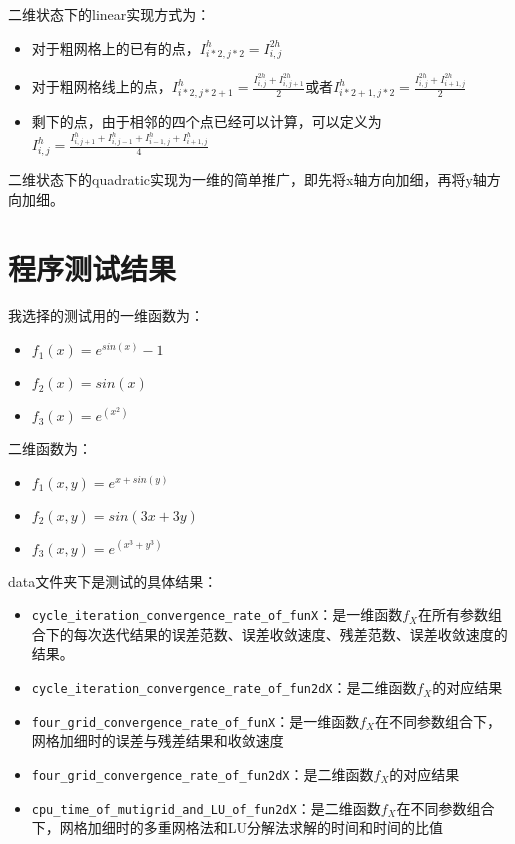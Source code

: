 \documentclass[12]{article}%
\begin{document}
二维状态下的linear实现方式为：
\begin{itemize}
    \item 对于粗网格上的已有的点，$I^h_{i*2,j*2}=I^{2h}_{i,j}$
    \item 对于粗网格线上的点，$I^h_{i*2,j*2+1}=\frac{I^{2h}_{i,j}+I^{2h}_{i,j+1}}{2}$或者$I^h_{i*2+1,j*2}=\frac{I^{2h}_{i,j}+I^{2h}_{i+1,j}}{2}$
    \item 剩下的点，由于相邻的四个点已经可以计算，可以定义为$I^h_{i,j}=\frac{I^h_{i,j+1}+I^h_{i,j-1}+I^h_{i-1,j}+I^h_{i+1,j}}{4}$
\end{itemize}

二维状态下的quadratic实现为一维的简单推广，即先将x轴方向加细，再将y轴方向加细。

\section{程序测试结果}
我选择的测试用的一维函数为：
\begin{itemize}
    \item $f_1(x)=e^{sin(x)}-1$
    \item $f_2(x)=sin(x)$
    \item $f_3(x)=e^(x^2)$
\end{itemize}
二维函数为：
\begin{itemize}
    \item $f_1(x,y)=e^{x+sin(y)}$
    \item $f_2(x,y)=sin(3x+3y)$
    \item $f_3(x,y)=e^(x^3+y^3)$
\end{itemize}

data文件夹下是测试的具体结果：
\begin{itemize}
    \item \verb|cycle_iteration_convergence_rate_of_funX|：是一维函数$f_X$在所有参数组合下的每次迭代结果的误差范数、误差收敛速度、残差范数、误差收敛速度的结果。
    \item \verb|cycle_iteration_convergence_rate_of_fun2dX|：是二维函数$f_X$的对应结果
    \item \verb|four_grid_convergence_rate_of_funX|：是一维函数$f_X$在不同参数组合下，网格加细时的误差与残差结果和收敛速度
    \item \verb|four_grid_convergence_rate_of_fun2dX|：是二维函数$f_X$的对应结果
    \item \verb|cpu_time_of_mutigrid_and_LU_of_fun2dX|：是二维函数$f_X$在不同参数组合下，网格加细时的多重网格法和LU分解法求解的时间和时间的比值
\end{itemize}
\end{document}
